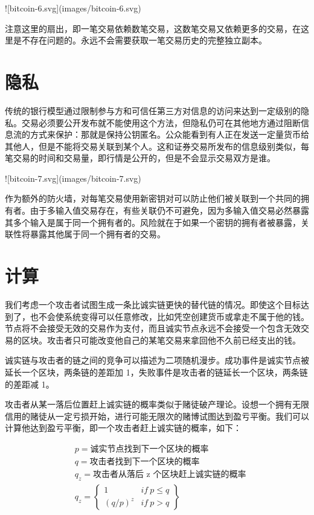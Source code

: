 \documentclass{article}
\begin{document}
![bitcoin-6.svg](images/bitcoin-6.svg)

注意这里的扇出，即一笔交易依赖数笔交易，这数笔交易又依赖更多的交易，在这里是不存在问题的。永远不会需要获取一笔交易历史的完整独立副本。

\section{隐私}
传统的银行模型通过限制参与方和可信任第三方对信息的访问来达到一定级别的隐私。交易必须要公开发布就不能使用这个方法，但隐私仍可在其他地方通过阻断信息流的方式来保护：那就是保持公钥匿名。公众能看到有人正在发送一定量货币给其他人，但是不能将交易关联到某个人。这和证券交易所发布的信息级别类似，每笔交易的时间和交易量，即行情是公开的，但是不会显示交易双方是谁。

![bitcoin-7.svg](images/bitcoin-7.svg)

作为额外的防火墙，对每笔交易使用新密钥对可以防止他们被关联到一个共同的拥有者。由于多输入值交易存在，有些关联仍不可避免，因为多输入值交易必然暴露其多个输入是属于同一个拥有者的。风险就在于如果一个密钥的拥有者被暴露，关联性将暴露其他属于同一个拥有者的交易。

\section{计算}

我们考虑一个攻击者试图生成一条比诚实链更快的替代链的情况。即使这个目标达到了，也不会使系统变得可以任意修改，比如凭空创建货币或拿走不属于他的钱。节点将不会接受无效的交易作为支付，而且诚实节点永远不会接受一个包含无效交易的区块。攻击者只可能改变他自己的某笔交易来拿回他不久前已经支出的钱。

诚实链与攻击者的链之间的竞争可以描述为二项随机漫步。成功事件是诚实节点被延长一个区块，两条链的差距加 1，失败事件是攻击者的链延长一个区块，两条链的差距减 1。

攻击者从某一落后位置赶上诚实链的概率类似于赌徒破产理论。设想一个拥有无限信用的赌徒从一定亏损开始，进行可能无限次的赌博试图达到盈亏平衡。我们可以计算他达到盈亏平衡，即一个攻击者赶上诚实链的概率，如下\cite{Feller}：

\begin{align*}
  & p = \text{诚实节点找到下一个区块的概率}            \\
  & q = \text{攻击者找到下一个区块的概率}              \\
  & q_z = \text{攻击者从落后 z 个区块赶上诚实链的概率} \\
  & q_z =                                              
 \begin{Bmatrix}
  1         & if \ p \leq q \\
  (q / p)^z & if \ p > q    
 \end{Bmatrix}
\end{align*}
\end{document}
